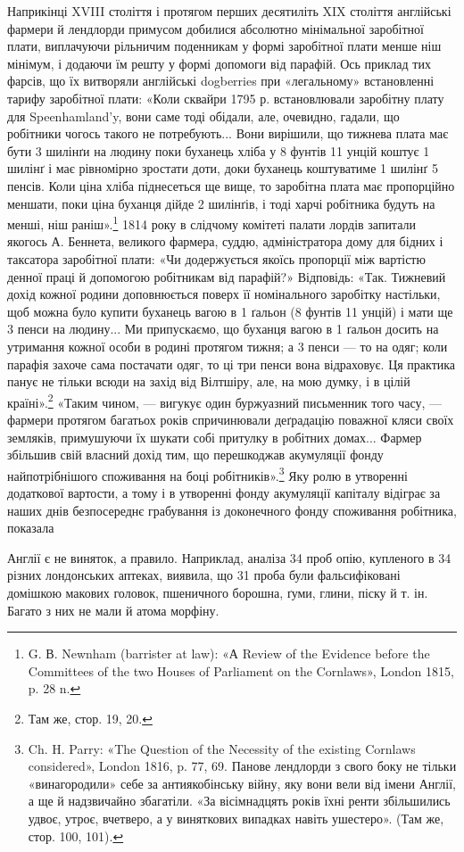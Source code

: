 Наприкінці XVIII століття і протягом перших десятиліть
XIX століття англійські фармери й лендлорди примусом добилися
абсолютно мінімальної заробітної плати, виплачуючи рільничим
поденникам у формі заробітної плати менше ніш мінімум,
і додаючи їм решту у формі допомоги від парафій. Ось приклад
тих фарсів, що їх витворяли англійські dogberries при «легальному»
встановленні тарифу заробітної плати: «Коли сквайри
1795 р. встановлювали заробітну плату для Speenhamland’y,
вони саме тоді обідали, але, очевидно, гадали, що робітники
чогось такого не потребують... Вони вирішили, що тижнева
плата має бути 3 шилінґи на людину поки буханець хліба
у 8 фунтів 11 унцій коштує 1 шилінґ і має рівномірно зростати
доти, доки буханець коштуватиме 1 шилінґ 5 пенсів.
Коли ціна хліба піднесеться ще вище, то заробітна плата
має пропорційно меншати, поки ціна буханця дійде 2 шилінґів,
і тоді харчі робітника будуть на  менші, ніш раніш».\footnote{
G. В. Newnham (barrister at law): «А Review of the Evidence
before the Committees of the two Houses of Parliament on the Cornlaws»,
London 1815, p. 28 n.
}
1814 року в слідчому комітеті палати лордів запитали якогось
А. Беннета, великого фармера, суддю, адміністратора дому для
бідних і таксатора заробітної плати: «Чи додержується якоїсь
пропорції між вартістю денної праці й допомогою робітникам
від парафій?» Відповідь: «Так. Тижневий дохід кожної родини
доповнюється поверх її номінального заробітку настільки, щоб
можна було купити буханець вагою в 1 ґальон (8 фунтів 11 унцій)
і мати ще 3 пенси на людину... Ми припускаємо, що буханця
вагою в 1 ґальон досить на утримання кожної особи в родині
протягом тижня; а 3 пенси — то на одяг; коли парафія захоче
сама постачати одяг, то ці три пенси вона відраховує. Ця практика
панує не тільки всюди на захід від Вілтшіру, але, на мою
думку, і в цілій країні».\footnote{
Там же, стор. 19, 20.
} «Таким чином, — вигукує один буржуазний
письменник того часу, — фармери протягом багатьох років
спричинювали деґрадацію поважної кляси своїх земляків, примушуючи
їх шукати собі притулку в робітних домах... Фармер
збільшив свій власний дохід тим, що перешкоджав акумуляції
фонду найпотрібнішого споживання на боці робітників».\footnote{
Ch. H. Parry: «The Question of the Necessity of the existing Cornlaws
considered», London 1816, p. 77, 69. Панове лендлорди з свого боку
не тільки «винагородили» себе за антиякобінську війну, яку вони вели
від імени Англії, а ще й надзвичайно збагатіли. «За вісімнадцять років
їхні ренти збільшились удвоє, утроє, вчетверо, а у виняткових випадках
навіть ушестеро». (Там же, стор. 100, 101).
} Яку
ролю в утворенні додаткової вартости, а тому і в утворенні
фонду акумуляції капіталу відіграє за наших днів безпосереднє
грабування із доконечного фонду споживання робітника, показала

Англії є не виняток, а правило. Наприклад, аналіза 34 проб опію, купленого
в 34 різних лондонських аптеках, виявила, що 31 проба були фальсифіковані
домішкою макових головок, пшеничного борошна, ґуми,
глини, піску й т. ін. Багато з них не мали й атома морфіну.